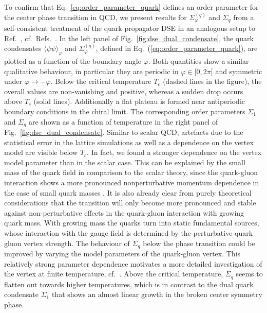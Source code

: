 \documentclass[final,twocolumn,merge,sort&compress]{elsarticle}
\begin{document}
To confirm that Eq.~\eqref{eq:order_parameter_quark} defines an order
parameter for the center phase transition in QCD, we present results
for $\Sigma_\varphi^{(q)}$ and $\Sigma_q$ from a self-consistent
treatment of the quark propagator DSE in an analogous setup to
Ref.~\cite{Fischer:2010fx},
cf.\ Refs.~\cite{Fischer:2009wc,Fischer:2009gk}.  In the left panel of
Fig.~\ref{fig:dse_dual_condensate}, the quark condensates
$\langle\bar\psi\psi\rangle_\varphi$ and $\Sigma_\varphi^{(q)}$,
defined in Eq.~(\ref{eq:order_parameter_quark}), are plotted as a
function of the boundary angle $\varphi$. Both quantities show a
similar qualitative behaviour, in particular they are periodic in
$\varphi \in [0,2\pi[$ and symmetric under
$\varphi\rightarrow -\varphi$. Below the critical temperature $T_c$
(dashed lines in the figure), the overall values are non-vanishing and
positive, whereas a sudden drop occurs above $T_c$ (solid
lines). Additionally a flat plateau is formed near antiperiodic
boundary conditions in the chiral limit.  The corresponding order
parameters $\Sigma_1$ and $\Sigma_q$ are shown as a function of
temperature in the right panel of Fig.~\ref{fig:dse_dual_condensate}.
Similar to scalar QCD, artefacts due to the statistical error in
the lattice simulations as well as a dependence on the vertex
model are visible below $T_c$. In fact, we found a stronger dependence
on the vertex model parameter than in the scalar case. This can be explained 
by the small mass of the quark field in comparison to the scalar theory,
since the quark-gluon interaction shows a more pronounced nonperturbative
momentum dependence in the case of small quark masses \cite{Williams:2014iea}.
It is also already clear from purely theoretical considerations that the transition
will only become more pronounced and stable against non-perturbative effects in the
quark-gluon interaction with growing quark mass. With growing mass the quarks turn into
static fundamental sources, whose interaction with the gauge field is
determined by the perturbative quark-gluon vertex strength.
The behaviour of
$\Sigma_q$ below the phase transition could be improved by varying the
model parameters of the quark-gluon vertex. This relatively strong
parameter dependence motivates a more detailed investigation of the
vertex at finite temperature, cf.\ \cite{Huber:2011xc,Hopfer:2013via}.  Above the
critical temperature, $\Sigma_q$ seems to flatten out towards higher
temperatures, which is in contrast to the dual quark condensate
$\Sigma_1$ that shows an almost linear growth in the broken center
symmetry phase.
\end{document}
